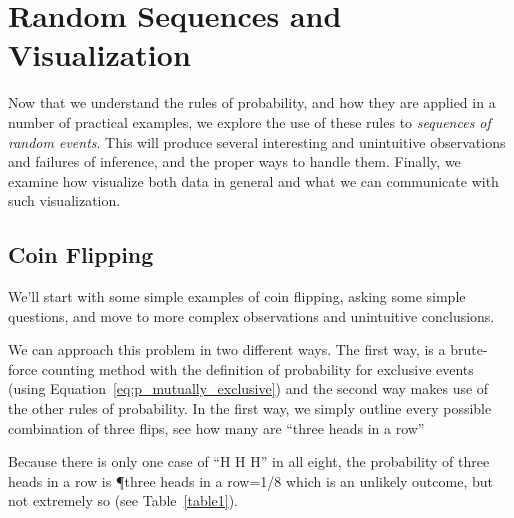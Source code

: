 \chapter{Random Sequences and Visualization}\label{ch:randomseq}

Now that we understand the rules of probability, and how they are applied in a number of practical examples, we explore the use of these rules to \emph{sequences of random events}.  This will produce several interesting and unintuitive observations and failures of inference, and the proper ways to handle them.  Finally, we examine how visualize both data in general and what we can communicate with such visualization.

\section{Coin Flipping}

We'll start with some simple examples of coin flipping, asking some simple questions, and move to more complex observations and unintuitive conclusions.


We can approach this problem in two different ways.  The first way, is a brute-force counting method with the definition of probability for exclusive events (using Equation~\ref{eq:p_mutually_exclusive}) and the second way makes use of the other rules of probability.  In the first way, we simply outline every possible combination of three flips, see how many are ``three heads in a row''


Because there is only one case of ``H H H'' in all eight, the probability of three heads in a row is
\beqn
\P{three heads in a row}=1/8
\eeqn
which is an unlikely outcome, but not extremely so (see Table~\ref{table1}).


